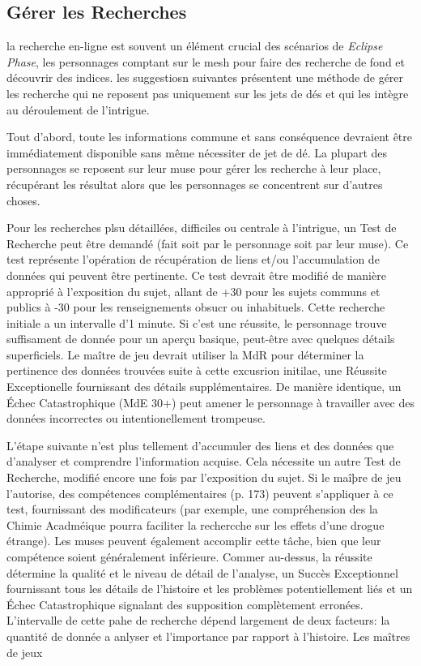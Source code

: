 \subsection{Gérer les Recherches} 

la recherche en-ligne est souvent un élément crucial des scénarios de \textit{Eclipse }\textit{Phase}, les personnages comptant sur le mesh pour faire des recherche de fond et découvrir des indices. les suggestiosn suivantes présentent une méthode de gérer les recherche qui ne reposent pas uniquement sur les jets de dés et qui les intègre au déroulement de l'intrigue. 

Tout d'abord, toute les informations commune et sans conséquence devraient être immédiatement disponible sans même nécessiter de jet de dé. La plupart des personnages se reposent sur leur muse pour gérer les recherche à leur place, récupérant les résultat alors que les personnages se concentrent sur d'autres choses. 

Pour les recherches plsu détaillées, difficiles ou centrale à l'intrigue, un Test de Recherche peut être demandé (fait soit par le personnage soit par leur muse). Ce test représente l'opération de récupération de liens et/ou l'accumulation de données qui peuvent être pertinente. Ce test devrait être modifié de manière approprié à l'exposition du sujet, allant de +30 pour les sujets communs et publics à -30 pour les renseignements obsucr ou inhabituels. Cette recherche initiale a un intervalle d'1 minute. Si c'est une réussite, le personnage trouve suffisament de donnée pour un aperçu basique, peut-être avec quelques détails superficiels. Le maître de jeu devrait utiliser la MdR pour déterminer la pertinence des données trouvées suite à cette excusrion initilae, une Réussite Exceptionelle fournissant des détails supplémentaires. De manière identique, un Échec Catastrophique (MdE 30+) peut amener le personnage à travailler avec des données incorrectes ou intentionellement trompeuse. 

L'étape suivante n'est plus tellement d'accumuler des liens et des données que d'analyser  et comprendre l'information acquise. Cela nécessite un autre Test de Recherche, modifié encore une fois par l'exposition du sujet. Si le maîþre de jeu l'autorise, des compétences complémentaires (p. 173) peuvent s'appliquer à ce test, fournissant des modificateurs (par exemple, une compréhension des la Chimie Acadméique pourra faciliter la rechercche sur les effets d'une drogue étrange). Les muses peuvent également accomplir cette tâche, bien que leur compétence soient généralement inférieure. Commer au-dessus, la réussite détermine la qualité et le niveau de détail de l'analyse, un Succès Exceptionnel fournissant tous les détails de l'histoire et les problèmes potentiellement liés et un Échec Catastrophique signalant des supposition complètement erronées. L'intervalle de cette pahe de recherche dépend largement de deux facteurs: la quantité de donnée a anlyser et l'importance par rapport à l'histoire. Les maîtres de jeux 

